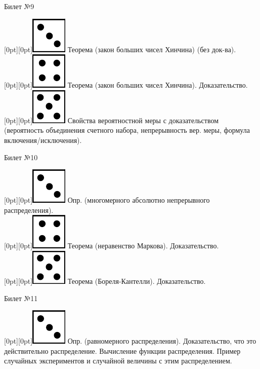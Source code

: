 \documentclass[10pt]{article}
\begin{document}
\begin{center} {\Large Билет №9} \end{center} 

\raisebox{-1pt}[0pt][0pt]{\includegraphics[width=0.02\linewidth]{3.png}} Теорема (закон больших чисел Хинчина) (без док-ва). \\

\raisebox{-1pt}[0pt][0pt]{\includegraphics[width=0.02\linewidth]{4.png}}  Теорема (закон больших чисел Хинчина).  Доказательство. \\

\raisebox{-1pt}[0pt][0pt]{\includegraphics[width=0.02\linewidth]{5.png}} Свойства  вероятностной меры с доказательством (вероятность объединения счетного набора, непрерывность вер. меры, формула включения/исключения). \\

\begin{center} {\Large Билет №10} \end{center} 

\raisebox{-1pt}[0pt][0pt]{\includegraphics[width=0.02\linewidth]{3.png}} Опр. (многомерного абсолютно непрерывного распределения). \\

\raisebox{-1pt}[0pt][0pt]{\includegraphics[width=0.02\linewidth]{4.png}} Теорема (неравенство Маркова). Доказательство. \\

\raisebox{-1pt}[0pt][0pt]{\includegraphics[width=0.02\linewidth]{5.png}} Теорема (Бореля-Кантелли). Доказательство. \\

\begin{center} {\Large Билет №11} \end{center} 

\raisebox{-1pt}[0pt][0pt]{\includegraphics[width=0.02\linewidth]{3.png}}  Опр. (равномерного распределения). Доказательство, что это действительно распределение. Вычисление функции распределения. Пример случайных экспериментов и случайной величины с этим распределением. \\
\end{document}
